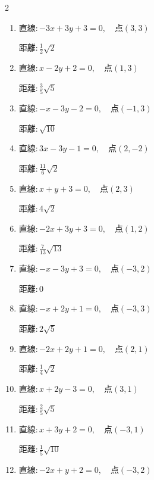 \begin{multicols}{2}
\begin{enumerate}
        $\displaystyle 距離 : \frac{1}{5}\sqrt{5}$

  \item $直線:-3x+3y+3=0,\quad 点 ( 3, 3 )$

        $\displaystyle 距離 : \frac{1}{2}\sqrt{2}$

  \item $直線:x-2y+2=0,\quad 点 ( 1, 3 )$

        $\displaystyle 距離 : \frac{3}{5}\sqrt{5}$

  \item $直線:-x-3y-2=0,\quad 点 ( -1, 3 )$

        $\displaystyle 距離 : \sqrt{10}$

  \item $直線:3x-3y-1=0,\quad 点 ( 2, -2 )$

        $\displaystyle 距離 : \frac{11}{6}\sqrt{2}$

  \item $直線:x+y+3=0,\quad 点 ( 2, 3 )$

        $\displaystyle 距離 : 4\sqrt{2}$

  \item $直線:-2x+3y+3=0,\quad 点 ( 1, 2 )$

        $\displaystyle 距離 : \frac{7}{13}\sqrt{13}$

\columnbreak %

  \item $直線:-x-3y+3=0,\quad 点 ( -3, 2 )$

        $\displaystyle 距離 : 0$

  \item $直線:-x+2y+1=0,\quad 点 ( -3, 3 )$

        $\displaystyle 距離 : 2\sqrt{5}$

  \item $直線:-2x+2y+1=0,\quad 点 ( 2, 1 )$

        $\displaystyle 距離 : \frac{1}{4}\sqrt{2}$

  \item $直線:x+2y-3=0,\quad 点 ( 3, 1 )$

        $\displaystyle 距離 : \frac{2}{5}\sqrt{5}$

  \item $直線:x+3y+2=0,\quad 点 ( -3, 1 )$

        $\displaystyle 距離 : \frac{1}{5}\sqrt{10}$

  \item $直線:-2x+y+2=0,\quad 点 ( -3, 2 )$


\end{enumerate}
\end{multicols}
